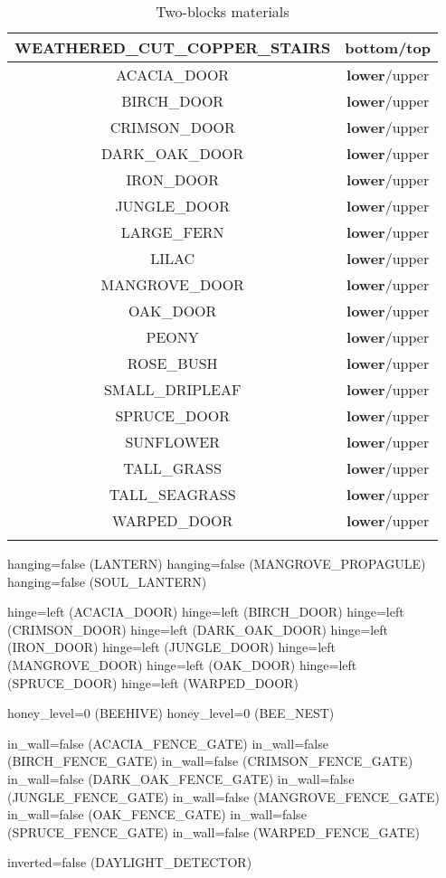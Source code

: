 \begin{longtable}{ |c|c| }
	WEATHERED\_CUT\_COPPER\_STAIRS & \textbf{bottom}/top \\
	\hline
	ACACIA\_DOOR & \textbf{lower}/upper \\
	BIRCH\_DOOR & \textbf{lower}/upper \\
	CRIMSON\_DOOR & \textbf{lower}/upper \\
	DARK\_OAK\_DOOR & \textbf{lower}/upper \\
	IRON\_DOOR & \textbf{lower}/upper \\
	JUNGLE\_DOOR & \textbf{lower}/upper \\
	LARGE\_FERN & \textbf{lower}/upper \\
	LILAC & \textbf{lower}/upper \\
	MANGROVE\_DOOR & \textbf{lower}/upper \\
	OAK\_DOOR & \textbf{lower}/upper \\
	PEONY & \textbf{lower}/upper \\
	ROSE\_BUSH & \textbf{lower}/upper \\
	SMALL\_DRIPLEAF & \textbf{lower}/upper \\
	SPRUCE\_DOOR & \textbf{lower}/upper \\
	SUNFLOWER & \textbf{lower}/upper \\
	TALL\_GRASS & \textbf{lower}/upper \\
	TALL\_SEAGRASS & \textbf{lower}/upper \\
	WARPED\_DOOR & \textbf{lower}/upper \\
	\hline
	\caption{Two-blocks materials}
\end{longtable}


hanging=false (LANTERN)
hanging=false (MANGROVE_PROPAGULE)
hanging=false (SOUL_LANTERN)

hinge=left (ACACIA_DOOR)
hinge=left (BIRCH_DOOR)
hinge=left (CRIMSON_DOOR)
hinge=left (DARK_OAK_DOOR)
hinge=left (IRON_DOOR)
hinge=left (JUNGLE_DOOR)
hinge=left (MANGROVE_DOOR)
hinge=left (OAK_DOOR)
hinge=left (SPRUCE_DOOR)
hinge=left (WARPED_DOOR)

honey_level=0 (BEEHIVE)
honey_level=0 (BEE_NEST)

in_wall=false (ACACIA_FENCE_GATE)
in_wall=false (BIRCH_FENCE_GATE)
in_wall=false (CRIMSON_FENCE_GATE)
in_wall=false (DARK_OAK_FENCE_GATE)
in_wall=false (JUNGLE_FENCE_GATE)
in_wall=false (MANGROVE_FENCE_GATE)
in_wall=false (OAK_FENCE_GATE)
in_wall=false (SPRUCE_FENCE_GATE)
in_wall=false (WARPED_FENCE_GATE)

inverted=false (DAYLIGHT_DETECTOR)

